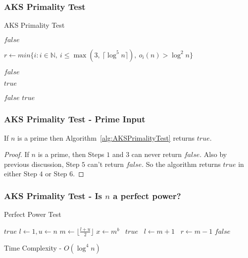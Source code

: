 \documentclass{beamer}
\begin{document}
\begin{frame}
\frametitle{AKS Primality Test}
\begin{algorithm}[H]
\caption{AKS Primality Test}
\label{alg:AKSPrimalityTest}
\begin{algorithmic}

	\State \Return $false$  
\EndIf

\State $r \gets min \{i: i \in \mathbb{N},\ i \leq \max(3,\ \lceil \log^5 n \rceil),\ o_i(n) > \log^2 n \}$ 

		\State \Return $false$  
	\EndIf
\EndFor

	\Return $true$  
\EndIf

		\State \Return $false$  
	\EndIf
\EndFor
\State \Return $true$ 
\EndProcedure
\end{algorithmic}
\end{algorithm}
\end{frame}

\begin{frame}
\frametitle{AKS Primality Test - Prime Input}
\begin{lemma}
\label{lemma:AKSLemma1}
If $n$ is a prime then Algorithm~\ref{alg:AKSPrimalityTest} returns $true$.
\end{lemma}
\begin{proof}
If $n$ is a prime, then Steps $1$ and $3$ can never return $false$. Also by previous discussion, Step $5$ can't return $false$. So the algorithm returns $true$ in either Step $4$ or Step $6$.
\end{proof}
\end{frame}

\begin{frame}
\frametitle{AKS Primality Test - Is $n$ a perfect power?}
\begin{algorithm}[H]
\caption{Perfect Power Test}
\label{alg:PerfectPowerTest}
\begin{algorithmic}
	\State \Return $true$
\EndIf
{}
	\State $l \gets 1, u \gets n$
		\State $m \gets \lfloor \frac{l+u}{2} \rfloor$
		\State $x \gets m^b$ 
			\ \Return $true$
			\ $l \gets m+1$
		\Else
			\ $r \gets m-1$
		\EndIf
	\EndWhile
\EndFor
\State \Return $false$
\EndProcedure
\end{algorithmic}
\end{algorithm}
Time Complexity - $O(\log^4 n)$
\end{frame}
\end{document}
